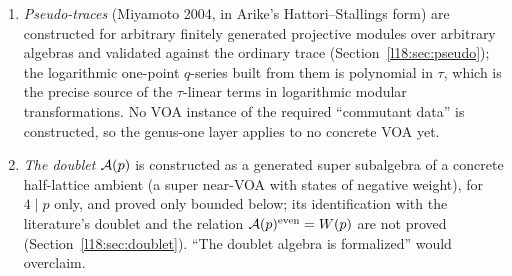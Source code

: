 \begin{enumerate}
  () and is \textbf{conditional}; all four generators are proved nilpotent in $A_2$; non-rationality
  and non-semisimplicity of Zhu's algebra are proved only \textbf{conditionally} on explicitly cited literature
  theorems (, a Wedderburn block count, and $\dim\ge5$ of a block space, or $\dim A(V)=11$ in place of
  the $C_2$/block-space pair; the fourth input of the non-rationality theorem, the semisimplicity criterion ,
  is discharged for every VOA by , Chapter~\ref{ch:L12}); and a logarithmic module (one on which $L_0$ has a nonzero nilpotent
  part) is constructed conditionally on \textbf{four} hypotheses, not one: two finiteness hypotheses on Zhu's algebras
  (, ), the Dong--Jiang gate , and . The
  last literally asserts that $[\omega]-h$ is not semisimple in $A(V)$, so the Jordan block of the module is a formal
  transcription of that hypothesis, which is proved for no VOA and no $h$.
\item \emph{Pseudo-traces} (Miyamoto 2004, in Arike's Hattori--Stallings form) are constructed for
  arbitrary finitely generated projective modules over arbitrary algebras and validated against the
  ordinary trace (Section~\ref{l18:sec:pseudo}); the logarithmic one-point $q$-series built from
  them is polynomial in $\tau$, which is the precise source of the $\tau$-linear terms in
  logarithmic modular transformations. No VOA instance of the required ``commutant data'' is
  constructed, so the genus-one layer applies to no concrete VOA yet.
\item \emph{The doublet} $\mathcal{A}(p)$ is constructed as a generated super subalgebra of a
  concrete half-lattice ambient (a super near-VOA with states of negative weight), for $4\mid p$ only,
  and proved only bounded below; its identification
  with the literature's doublet and the relation $\mathcal{A}(p)^{\mathrm{even}}=W(p)$ are not proved
  (Section~\ref{l18:sec:doublet}). ``The doublet algebra is formalized'' would overclaim.
\end{enumerate}

